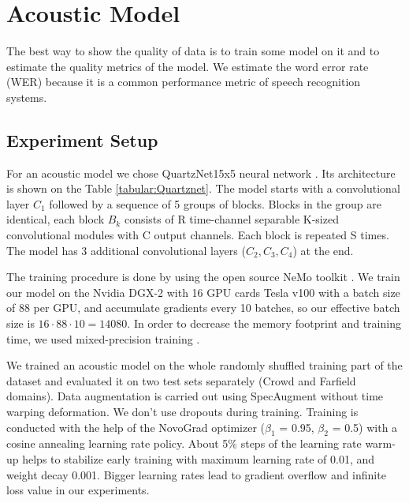 \documentclass[a4paper]{article}
\begin{document}
\section{Acoustic Model}

The best way to show the quality of data is to train some model on it and to estimate the quality metrics of the model. We estimate the word error rate (WER) because it is a common performance metric of speech recognition systems.  

\subsection{Experiment Setup}

For an acoustic model we chose QuartzNet15x5 neural network \cite{kriman2020quartznet}. Its architecture is shown on the Table \ref{tabular:Quartznet}. The model starts with a convolutional layer $C_1$ followed by a sequence of 5 groups of blocks. Blocks in the group are identical, each block $B_k$ consists of R time-channel separable K-sized convolutional modules with C output channels. Each block is repeated S times. The model has 3 additional convolutional layers ($C_2, C_3, C_4$) at the end.

The training procedure is done by using the open source NeMo toolkit \cite{kuchaiev2019nemo}. We train our model on the Nvidia DGX-2 with 16 GPU cards Tesla v100 with a batch size of 88 per GPU, and accumulate gradients every 10 batches, so our effective batch size is $16 \cdot 88 \cdot 10 = 14080$. In order to decrease the memory footprint and training time, we used mixed-precision training \cite{micikevicius2017mixed}.

We trained an acoustic model on the whole randomly shuffled training part of the dataset and evaluated it on two test sets separately (Crowd and Farfield domains). Data augmentation is carried out using SpecAugment \cite{park2019specaugment} without time warping deformation. We don't use dropouts during training. Training is conducted with the help of the NovoGrad \cite{ginsburg2019stochastic} optimizer ($\beta_1$ = 0.95, $\beta_2$ = 0.5) with a cosine annealing learning rate policy. About 5\% steps of the learning rate warm-up helps to stabilize early training with maximum learning rate of 0.01, and weight decay 0.001. Bigger learning rates lead to gradient overflow and infinite loss value in our experiments. 
\end{document}
